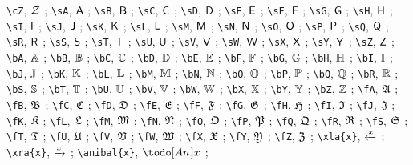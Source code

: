 \verb|\cZ|, $\mathcal{Z}$ ;
\verb|\sA|, $\mathsf{A}$ ;
\verb|\sB|, $\mathsf{B}$ ;
\verb|\sC|, $\mathsf{C}$ ;
\verb|\sD|, $\mathsf{D}$ ;
\verb|\sE|, $\mathsf{E}$ ;
\verb|\sF|, $\mathsf{F}$ ;
\verb|\sG|, $\mathsf{G}$ ;
\verb|\sH|, $\mathsf{H}$ ;
\verb|\sI|, $\mathsf{I}$ ;
\verb|\sJ|, $\mathsf{J}$ ;
\verb|\sK|, $\mathsf{K}$ ;
\verb|\sL|, $\mathsf{L}$ ;
\verb|\sM|, $\mathsf{M}$ ;
\verb|\sN|, $\mathsf{N}$ ;
\verb|\sO|, $\mathsf{O}$ ;
\verb|\sP|, $\mathsf{P}$ ;
\verb|\sQ|, $\mathsf{Q}$ ;
\verb|\sR|, $\mathsf{R}$ ;
\verb|\sS|, $\mathsf{S}$ ;
\verb|\sT|, $\mathsf{T}$ ;
\verb|\sU|, $\mathsf{U}$ ;
\verb|\sV|, $\mathsf{V}$ ;
\verb|\sW|, $\mathsf{W}$ ;
\verb|\sX|, $\mathsf{X}$ ;
\verb|\sY|, $\mathsf{Y}$ ;
\verb|\sZ|, $\mathsf{Z}$ ;
\verb|\bA|, $\mathbb{A}$ ;
\verb|\bB|, $\mathbb{B}$ ;
\verb|\bC|, $\mathbb{C}$ ;
\verb|\bD|, $\mathbb{D}$ ;
\verb|\bE|, $\mathbb{E}$ ;
\verb|\bF|, $\mathbb{F}$ ;
\verb|\bG|, $\mathbb{G}$ ;
\verb|\bH|, $\mathbb{H}$ ;
\verb|\bI|, $\mathbb{I}$ ;
\verb|\bJ|, $\mathbb{J}$ ;
\verb|\bK|, $\mathbb{K}$ ;
\verb|\bL|, $\mathbb{L}$ ;
\verb|\bM|, $\mathbb{M}$ ;
\verb|\bN|, $\mathbb{N}$ ;
\verb|\bO|, $\mathbb{O}$ ;
\verb|\bP|, $\mathbb{P}$ ;
\verb|\bQ|, $\mathbb{Q}$ ;
\verb|\bR|, $\mathbb{R}$ ;
\verb|\bS|, $\mathbb{S}$ ;
\verb|\bT|, $\mathbb{T}$ ;
\verb|\bU|, $\mathbb{U}$ ;
\verb|\bV|, $\mathbb{V}$ ;
\verb|\bW|, $\mathbb{W}$ ;
\verb|\bX|, $\mathbb{X}$ ;
\verb|\bY|, $\mathbb{Y}$ ;
\verb|\bZ|, $\mathbb{Z}$ ;
\verb|\fA|, $\mathfrak{A}$ ;
\verb|\fB|, $\mathfrak{B}$ ;
\verb|\fC|, $\mathfrak{C}$ ;
\verb|\fD|, $\mathfrak{D}$ ;
\verb|\fE|, $\mathfrak{E}$ ;
\verb|\fF|, $\mathfrak{F}$ ;
\verb|\fG|, $\mathfrak{G}$ ;
\verb|\fH|, $\mathfrak{H}$ ;
\verb|\fI|, $\mathfrak{I}$ ;
\verb|\fJ|, $\mathfrak{J}$ ;
\verb|\fK|, $\mathfrak{K}$ ;
\verb|\fL|, $\mathfrak{L}$ ;
\verb|\fM|, $\mathfrak{M}$ ;
\verb|\fN|, $\mathfrak{N}$ ;
\verb|\fO|, $\mathfrak{O}$ ;
\verb|\fP|, $\mathfrak{P}$ ;
\verb|\fQ|, $\mathfrak{Q}$ ;
\verb|\fR|, $\mathfrak{R}$ ;
\verb|\fS|, $\mathfrak{S}$ ;
\verb|\fT|, $\mathfrak{T}$ ;
\verb|\fU|, $\mathfrak{U}$ ;
\verb|\fV|, $\mathfrak{V}$ ;
\verb|\fW|, $\mathfrak{W}$ ;
\verb|\fX|, $\mathfrak{X}$ ;
\verb|\fY|, $\mathfrak{Y}$ ;
\verb|\fZ|, $\mathfrak{Z}$ ;
\verb|\xla{x}|, $\xleftarrow{x}$ ;
\verb|\xra{x}|, $\xrightarrow{x}$ ;
\verb|\anibal{x}|, $\anibal{x}$ ;
